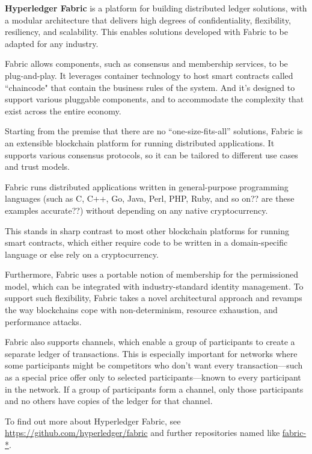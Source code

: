 \textbf{Hyperledger Fabric} is a platform for building distributed ledger solutions, with a modular architecture that delivers high degrees of confidentiality, flexibility, resiliency, and scalability. 
This enables solutions developed with Fabric to be adapted for any industry. 

Fabric allows components, such as consensus and membership services, to be plug-and-play. 
It leverages container technology to host smart contracts called ``chaincode" that contain the business rules of the system. 
And it's designed to support various pluggable components, and to accommodate the complexity that exist across the entire economy.

Starting from the premise that there are no ``one-size-fits-all'' solutions, Fabric is an extensible blockchain platform for running distributed applications. 
It supports various consensus protocols, so it can be tailored to different use cases and trust models. 

Fabric runs distributed applications written in general-purpose programming languages (such as C, C++, Go,  Java, Perl, PHP, Ruby, and so on?? are these examples accurate??) without depending on any native cryptocurrency.  

This stands in sharp contrast to most other blockchain platforms for running smart contracts, which either  require code to be written in a domain-specific language or else rely on a cryptocurrency. 

Furthermore, Fabric uses a portable notion of membership for the permissioned model, which can be integrated with industry-standard identity management.  
To support such flexibility, Fabric takes a novel architectural approach and revamps the way blockchains cope with non-determinism, resource exhaustion, and performance attacks.


Fabric also supports channels, which enable a group of participants to create a separate ledger of transactions. This is especially important for networks where some participants might be competitors who don't want every transaction---such as a special price offer only to selected participants---known to every participant in the network. 
If a group of participants form a channel, only those participants and no others have copies of the ledger for that channel.

To find out more about Hyperledger Fabric, see \url{https://github.com/hyperledger/fabric} and further repositories named like \url{fabric-*}.

